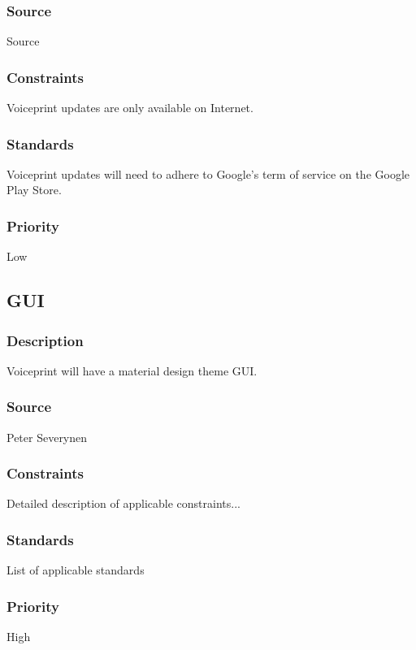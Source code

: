 \subsubsection{Source}
Source
\subsubsection{Constraints}
Voiceprint updates are only available on Internet.
\subsubsection{Standards}
Voiceprint updates will need to adhere to Google's term of service on the Google Play Store.
\subsubsection{Priority}
Low

\subsection{GUI}
\subsubsection{Description}
Voiceprint will have a material design theme GUI.
\subsubsection{Source}
Peter Severynen
\subsubsection{Constraints}
Detailed description of applicable constraints...
\subsubsection{Standards}
List of applicable standards
\subsubsection{Priority}
High